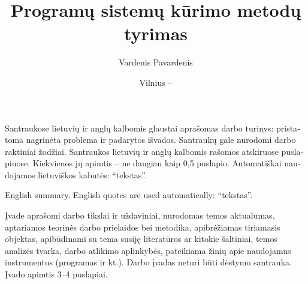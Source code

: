 \documentclass[
    monochrome, %
]{VUMIFSEMasterThesis}
\title{Programų sistemų kūrimo metodų tyrimas}
\author{Vardenis Pavardenis}
\date{Vilnius – \the\year}
\begin{document}
\maketitle


\begin{lithuanian}
Santraukose lietuvių ir anglų kalbomis glaustai aprašomas darbo turinys:
pristatoma nagrinėta problema ir padarytos išvados. Santraukų gale nurodomi
darbo raktiniai žodžiai. Santraukos lietuvių ir anglų kalbomis rašomos
atskiruose puslapiuose. Kiekvienos jų apimtis -- ne daugiau kaip 0,5 puslapio.
Automatiškai naudojamos lietuviškos kabutės: \enquote{tekstas}.

\end{lithuanian}

\begin{english}
English summary. English quotes are used automatically: \enquote{tekstas}.

\end{english}

\tableofcontents

Įvade aprašomi darbo tikslai ir uždaviniai, nurodomas temos aktualumas, aptariamos
teorinės darbo prielaidos bei metodika, apibrėžiamas tiriamasis objektas, apibūdinami
su tema susiję literatūros ar kitokie šaltiniai, temos analizės tvarka, darbo atlikimo
aplinkybės, pateikiama žinių apie naudojamus instrumentus (programas ir kt.). Darbo
įvadas neturi būti dėstymo santrauka. Įvado apimtis 3--4 puslapiai.
\end{document}
